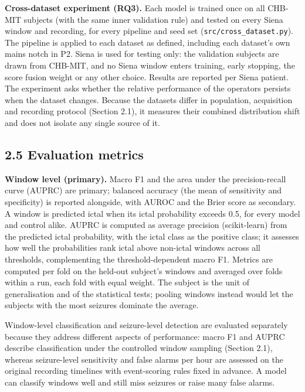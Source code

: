 \documentclass[11pt,a4paper]{article}
\begin{document}
\textbf{Cross-dataset experiment (RQ3).} Each model is trained once on all CHB-MIT subjects
(with the same inner validation rule) and tested on every Siena window and recording,
for every pipeline and seed set (\nolinkurl{src/cross_dataset.py}). The pipeline is applied to
each dataset as defined, including each dataset's own mains notch in P2. Siena is
used for testing only: the validation subjects are drawn from CHB-MIT, and no Siena
window enters training, early stopping, the score fusion weight or any other choice.
Results are reported per Siena patient. The experiment asks whether the relative
performance of the operators persists when the dataset changes. Because the datasets
differ in population, acquisition and recording protocol (Section 2.1), it measures
their combined distribution shift and does not isolate any single source of it.

\subsection{2.5 Evaluation metrics}\label{evaluation-metrics}

\textbf{Window level (primary).} Macro F1 and the area under the precision-recall curve
(AUPRC) are primary; balanced accuracy (the mean of sensitivity and specificity) is
reported alongside, with AUROC and the Brier score as secondary. A window is
predicted ictal when its ictal probability exceeds 0.5, for every model and control
alike. AUPRC is computed as average precision (scikit-learn) from the predicted ictal
probability, with the ictal class as the positive class; it assesses how well the
probabilities rank ictal above non-ictal windows across all thresholds, complementing
the threshold-dependent macro F1. Metrics are computed per fold on the held-out
subject's windows and averaged over folds within a run, each fold with equal weight.
The subject is the unit of generalisation and of the statistical tests; pooling
windows instead would let the subjects with the most seizures dominate the average.

Window-level classification and seizure-level detection are evaluated separately
because they address different aspects of performance: macro F1 and AUPRC describe
classification under the controlled window sampling (Section 2.1), whereas
seizure-level sensitivity and false alarms per hour are assessed on the original
recording timelines with event-scoring rules fixed in advance. A model can classify
windows well and still miss seizures or raise many false alarms.
\end{document}
